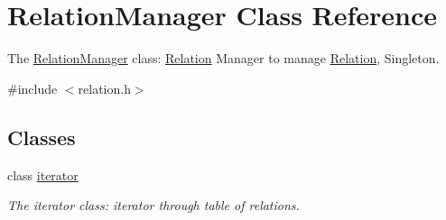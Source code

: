 \hypertarget{class_relation_manager}{}\section{Relation\+Manager Class Reference}
\label{class_relation_manager}


The \hyperlink{class_relation_manager}{Relation\+Manager} class\+: \hyperlink{class_relation}{Relation} Manager to manage \hyperlink{class_relation}{Relation}, Singleton.  




{\ttfamily \#include $<$relation.\+h$>$}

\subsection*{Classes}
\begin{DoxyCompactItemize}
\item 
class \hyperlink{class_relation_manager_1_1iterator}{iterator}
\begin{DoxyCompactList}\small\item\em The iterator class\+: iterator through table of relations. \end{DoxyCompactList}\end{DoxyCompactItemize}
